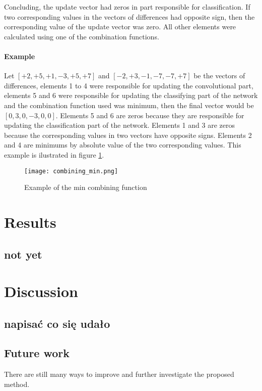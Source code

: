 \documentclass[a4paper,10pt]{report}
\begin{document}
      Concluding, the update vector had zeros in part responsible for classification. If two corresponding values in the vectors of differences had opposite sign, then the corresponding value of the update vector was zero. All other elements were calculated using one of the combination functions. 
      
      \subsubsection{Example}
      Let $[+2, +5, +1, -3, +5, +7]$ and $[-2, +3, -1, -7, -7, +7]$ be the vectors of differences, elements 1 to 4 were responsible for updating the convolutional part, elements 5 and 6 were responsible for updating the classifying part of the network and the combination function used was minimum, then the final vector would be $[0, 3, 0, -3, 0, 0]$. Elements 5 and 6 are zeros because they are responsible for updating the classification part of the network. Elements 1 and 3 are zeros because the corresponding values in two vectors have opposite signs. Elements 2 and 4 are minimums by absolute value of the two corresponding values. This example is ilustrated in figure \ref{fig:combining}. 
      
      \begin{figure}[h!]
	  \centering
	  \texttt{[image: combining\_min.png]}
	  \caption{Example of the min combining function}
	  \label{fig:combining}
	\end{figure} 
	
   \chapter{Results} %
    \section{not yet}
     
	
  \chapter{Discussion}
    \section{napisać co się udało}
    \section{Future work}
      There are still many ways to improve and further investigate the proposed method.
      
\end{document}
